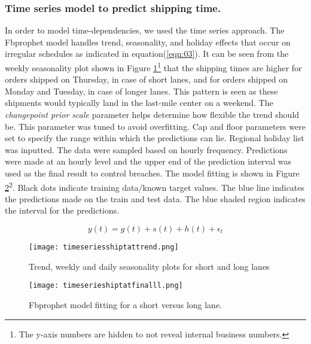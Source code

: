\documentclass[twoside,leqno,twocolumn]{article}
\begin{document}
\subsubsection{Time series model to predict shipping time.}
In order to model time-dependencies, we used the time series approach. The Fbprophet model handles trend, seasonality, and holiday effects that occur on irregular schedules as indicated in equation(\ref{eqn:03}). It can be seen from the weekly seasonality plot shown in Figure \ref{fig:timeseriesshiptattrend}\footnote{The y-axis numbers are hidden to not reveal internal business numbers.} that the shipping times are higher for orders shipped on Thursday, in case of short lanes, and for orders shipped on Monday and Tuesday, in case of longer lanes. This pattern is seen as these shipments would typically land in the last-mile center on a weekend. The \textit{changepoint prior scale} parameter helps determine how flexible the trend should be. This parameter was tuned to avoid overfitting. Cap and floor parameters were set to specify the range within which the predictions can lie. Regional holiday list was inputted. The data were sampled based on hourly frequency. Predictions were made at an hourly level and the upper end of the prediction interval was used as the final result to control breaches. The model fitting is shown in Figure \ref{fig:timeseriesshiptatfinalll}\textsuperscript{2}. Black dots indicate training data/known target values. The blue line indicates the predictions made on the train and test data. The blue shaded region indicates the interval for the predictions.

\begin{equation}\label{eqn:03}
y(t) = g(t) + s(t) + h(t) + \epsilon_{t}
\end{equation}

\begin{figure}[h]
    \texttt{[image: timeseriesshiptattrend.png]}
\caption{Trend, weekly and daily seasonality plots for short and long lanes}
    \label{fig:timeseriesshiptattrend}
    \vspace{-2mm}
\end{figure}

\begin{figure}[h]
    \texttt{[image: timeserieshiptatfinalll.png]}
\caption{Fbprophet model fitting for a short versus long lane.}
    \label{fig:timeseriesshiptatfinalll}
    \vspace{-2mm}
\end{figure}
\end{document}
